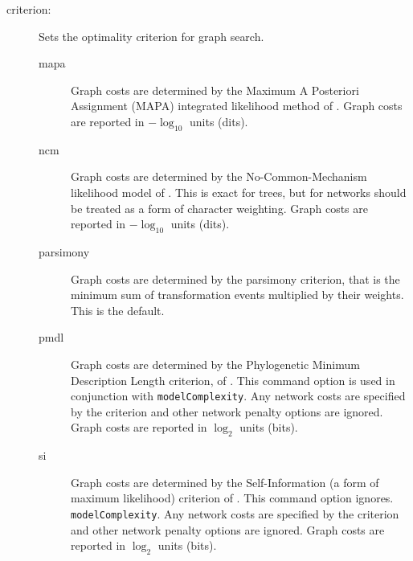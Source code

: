 \begin{description}
		\item[criterion:] Sets the optimality criterion for graph search.
			
		\begin{description}
			
			\item[mapa] Graph costs are determined by the Maximum A Posteriori 
			Assignment (MAPA) integrated likelihood method of \citep{Wheeler2014}. 
			Graph costs are reported in $- \log_{10}$ units (dits).
			
			\item[ncm] Graph costs are determined by the No-Common-Mechanism 
			likelihood model of \citep{TuffleyandSteel1997}. This is exact for trees, but 
			for networks should be treated as a form of character weighting. 
			Graph costs are reported in $- \log_{10}$ units (dits).
			
			\item[parsimony] Graph costs are determined by the parsimony criterion, 
			that is the minimum sum of transformation events multiplied by their weights. 
			This is the default.
			
			\item[pmdl] Graph costs are determined by the Phylogenetic Minimum 
			Description Length criterion, of \citep{WheelerandVaron2025}. This 
			command option is used in conjunction with \texttt{modelComplexity}. 
			Any network costs are specified by the criterion and other network
			penalty options are ignored. Graph costs are reported in $\log_{2}$ 
			units (bits).
			
			\item[si] Graph costs are determined by the Self-Information (a form 
			of maximum likelihood) criterion of \citep{WheelerandVaron2025}. 
			This command option ignores. \texttt{modelComplexity}. Any network 
			costs are specified by the criterion and other network penalty options 
			are ignored. Graph costs are reported in $\log_{2}$ units (bits).
			
			
		\end{description}
			

			

\end{description}
